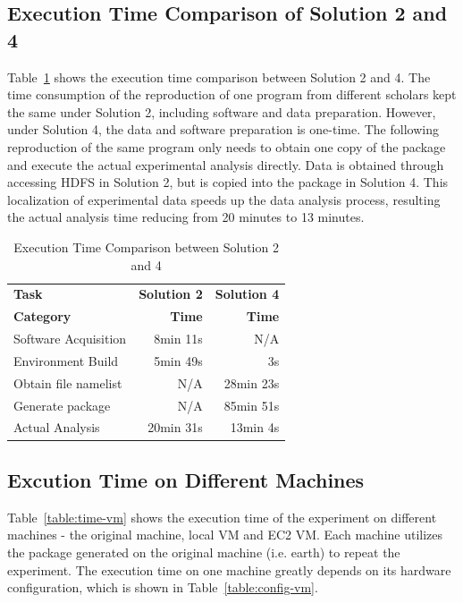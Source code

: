 \documentclass{acm_proc_article-sp}
\begin{document}
\subsection{Execution Time Comparison of Solution 2 and 4}

Table~\ref{table:time-2nd3rd} shows the execution time comparison between
Solution 2 and 4. The time consumption of the reproduction of one program from
different scholars kept the same under Solution 2, including software and data
preparation. However, under Solution 4, the data and software preparation is
one-time. The following reproduction of the same program only needs to obtain
one copy of the package and execute the actual experimental analysis directly.
Data is obtained through accessing HDFS in Solution 2, but is copied into the package in Solution 4. This localization of experimental data speeds up the data analysis process, resulting the actual analysis time reducing from 20 minutes to 13 minutes.

\begin{table}
    \centering
    \begin{tabular}{|l|r|r|}
    \hline
    \bf Task & \bf Solution 2& \bf Solution 4\\ 
    \bf Category & \bf Time & \bf Time \\ \hline
    Software Acquisition & 8min 11s & N/A \\ \hline
    Environment Build & 5min 49s  & 3s \\ \hline
    Obtain file namelist & N/A & 28min 23s \\ \hline
    Generate package & N/A & 85min 51s \\ \hline
    Actual Analysis & 20min 31s & 13min 4s \\ \hline
    \end{tabular}
    \caption{Execution Time Comparison between Solution 2 and 4}
    \label{table:time-2nd3rd}
\end{table}    

\subsection{Excution Time on Different Machines}
Table~\ref{table:time-vm} shows the execution time of the experiment on different machines - the original machine, local VM and EC2 VM. 
Each machine utilizes the package generated on the original machine (i.e. earth) to repeat the experiment.
The execution time on one machine greatly depends on its hardware configuration, which is shown in Table~\ref{table:config-vm}.
\end{document}
